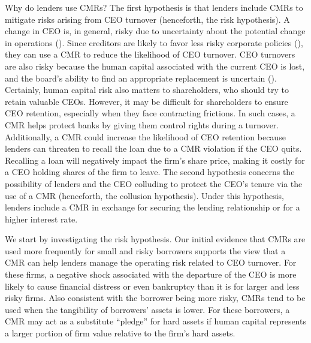 \documentclass[a4paper,12pt]{article}
\begin{document}
Why do lenders use CMRs?
The first hypothesis is that lenders include CMRs to mitigate risks arising from CEO turnover (henceforth, the risk hypothesis).
A change in CEO is, in general, risky due to uncertainty about the potential change in operations (\citet{Berkovitch_1996, Grinstein_2006}).
Since creditors are likely to favor less risky corporate policies (\citet{Jensen_1976}), they can use a CMR to reduce the likelihood of CEO turnover.
CEO turnovers are also risky because the human capital associated with the current CEO is lost, and the board's ability to find an appropriate replacement is uncertain (\citet{Becker_1964}).
Certainly, human capital risk also matters to shareholders, who should try to retain valuable CEOs.
However, it may be difficult for shareholders to ensure CEO retention, especially when they face contracting frictions.
In such cases, a CMR helps protect banks by giving them control rights during a turnover.
Additionally, a CMR could increase the likelihood of CEO retention because lenders can threaten to recall the loan due to a CMR violation if the CEO quits.
Recalling a loan will negatively impact the firm's share price, making it costly for a CEO holding shares of the firm to leave.
The second hypothesis concerns the possibility of lenders and the CEO colluding to protect the CEO's tenure via the use of a CMR (henceforth, the collusion hypothesis).
Under this hypothesis, lenders include a CMR in exchange for securing the lending relationship or for a higher interest rate.


We start by investigating the risk hypothesis.
Our initial evidence that CMRs are used more frequently for small and risky borrowers supports the view that a CMR can help lenders manage the operating risk related to CEO turnover.
For these firms, a negative shock associated with the departure of the CEO is more likely to cause financial distress or even bankruptcy than it is for larger and less risky firms.
Also consistent with the borrower being more risky, CMRs tend to be used when the tangibility of borrowers' assets is lower.
For these borrowers, a CMR may act as a substitute ``pledge'' for hard assets if human capital represents a larger portion of firm value relative to the firm's hard assets.
\end{document}
